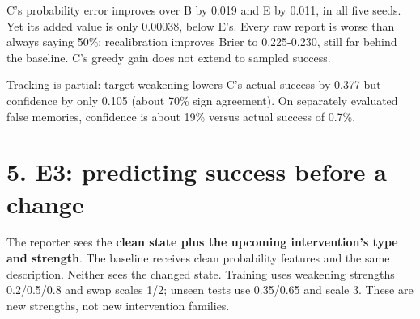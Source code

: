 \documentclass[10pt,a4paper]{article}
\begin{document}
\par{}\par\smallskip

C's probability error improves over B by 0.019 and E by 0.011, in all five seeds. Yet its added value is only 0.00038, below E's. Every raw report is worse than always saying 50\%; recalibration improves Brier to 0.225-0.230, still far behind the baseline. C's greedy gain does not extend to sampled success.
\par

Tracking is partial: target weakening lowers C's actual success by 0.377 but confidence by only 0.105 (about 70\% sign agreement). On separately evaluated false memories, confidence is about 19\% versus actual success of 0.7\%.
\par

\section*{5. E3: predicting success before a change}

The reporter sees the \textbf{clean state plus the upcoming intervention's type and strength}. The baseline receives clean probability features and the same description. Neither sees the changed state. Training uses weakening strengths 0.2/0.5/0.8 and swap scales 1/2; unseen tests use 0.35/0.65 and scale 3. These are new strengths, not new intervention families.
\par
\end{document}

